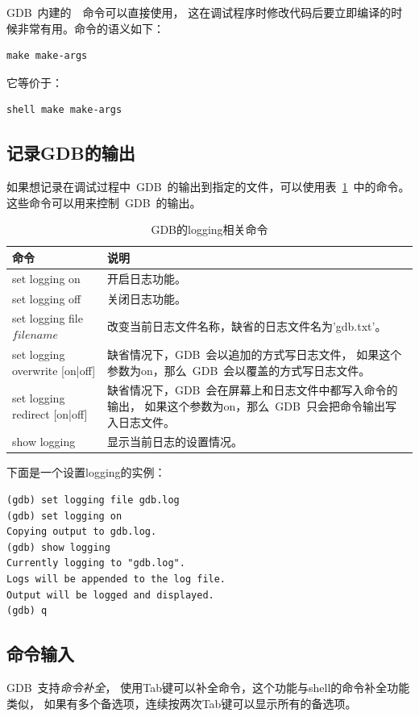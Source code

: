 GDB~内建的~~命令可以直接使用，
这在调试程序时修改代码后要立即编译的时候非常有用。命令的语义如下：
\begin{lstlisting}
make make-args
\end{lstlisting}
它等价于：
\begin{lstlisting}
shell make make-args
\end{lstlisting}

\subsection{记录GDB的输出}
如果想记录在调试过程中~GDB~的输出到指定的文件，可以使用表~\ref{tab:gdb_logging}~中的命令。
这些命令可以用来控制~GDB~的输出。

\begin{table}[!bhp]
\begin{tabularx}{400pt}{l|X}
\hline
\hline
命令 & 说明 \\
\hline
set logging on                  &   开启日志功能。  \\
set logging off                 &   关闭日志功能。  \\
set logging file $filename$     &   改变当前日志文件名称，缺省的日志文件名为'gdb.txt'。 \\
set logging overwrite [on|off]  &   缺省情况下，GDB~会以追加的方式写日志文件，
                                    如果这个参数为on，那么~GDB~会以覆盖的方式写日志文件。\\
set logging redirect [on|off]   &   缺省情况下，GDB~会在屏幕上和日志文件中都写入命令的输出，
                                    如果这个参数为on，那么~GDB~只会把命令输出写入日志文件。\\
show logging                    &   显示当前日志的设置情况。\\
\hline
\hline
\end{tabularx}
\caption{GDB的logging相关命令} \label{tab:gdb_logging}
\end{table}

下面是一个设置logging的实例：
\begin{lstlisting}
(gdb) set logging file gdb.log
(gdb) set logging on
Copying output to gdb.log.
(gdb) show logging
Currently logging to "gdb.log".
Logs will be appended to the log file.
Output will be logged and displayed.
(gdb) q
\end{lstlisting}

\subsection{命令输入}
GDB~支持\emph{命令补全}，
使用Tab键可以补全命令，这个功能与shell的命令补全功能类似，
如果有多个备选项，连续按两次Tab键可以显示所有的备选项。

